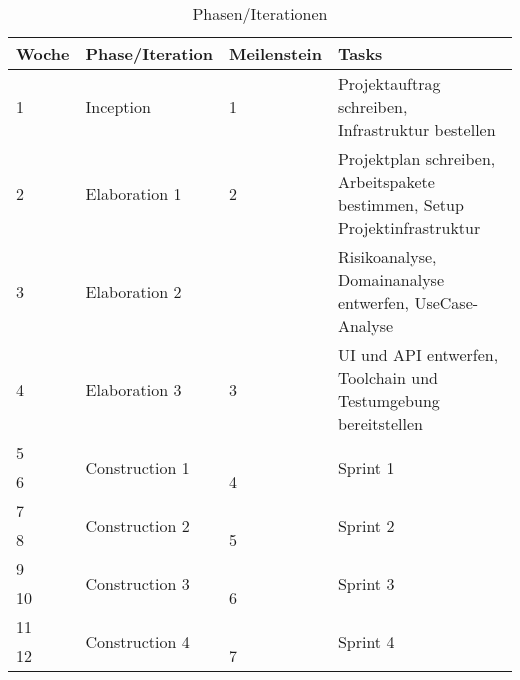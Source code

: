 \begin{table}[H]
    \centering
    \caption{Phasen/Iterationen}
    \label{phases}
    \begin{tabular}{| l | l | l | l |}
        \toprule
        Woche & Phase/Iteration                 & Meilenstein & Tasks                                                                      \\
        \midrule
        1     & Inception                       & 1           & Projektauftrag schreiben, Infrastruktur bestellen                          \\
        2     & Elaboration 1                   & 2           & Projektplan schreiben, Arbeitspakete bestimmen, Setup Projektinfrastruktur \\
        3     & Elaboration 2                   &             & Risikoanalyse, Domainanalyse entwerfen, UseCase-Analyse                    \\
        4     & Elaboration 3                   & 3           & UI und API entwerfen, Toolchain und Testumgebung bereitstellen             \\
        5     & \multirow{2}{*}{Construction 1} &             & \multirow{2}{*}{Sprint 1}                                                  \\
        6     &                                 & 4           &                                                                            \\
        7     & \multirow{2}{*}{Construction 2} &             & \multirow{2}{*}{Sprint 2}                                                  \\
        8     &                                 & 5           &                                                                            \\
        9     & \multirow{2}{*}{Construction 3} &             & \multirow{2}{*}{Sprint 3}                                                  \\
        10    &                                 & 6           &                                                                            \\
        11    & \multirow{2}{*}{Construction 4} &             & \multirow{2}{*}{Sprint 4}                                                  \\
        12    &                                 & 7           &                                                                            \\

\end{tabular}
\end{table}
